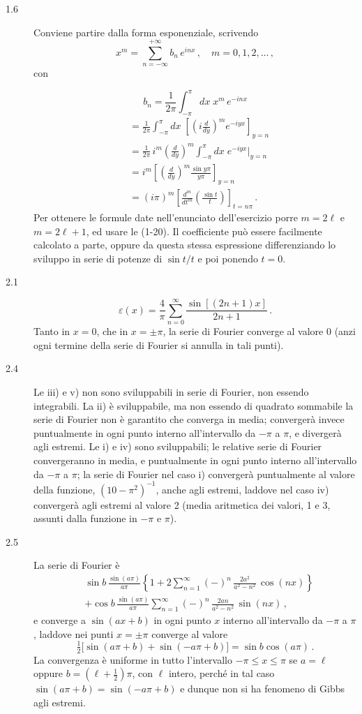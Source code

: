 \documentclass[11pt, a4paper]{book}
\numberwithin{equation}{section}
\begin{document}
\begin{description}
\item[1.6] Conviene partire dalla forma esponenziale, scrivendo
\[
  x^m = \sum_{n=-\infty}^{+\infty} b_n\,e^{inx}\,,\quad m=0,1,2,\ldots\,,
\]
con

\[
  b_n = \frac{1}{2\pi}\int_{-\pi}^{\pi} dx\;x^m\,e^{-inx}
\]
\begin{align*}
  &= \frac{1}{2\pi}\int_{-\pi}^{\pi} dx\;\left[\left(i\frac{d}{dy}\right)^m e^{-iyx}\right]_{y=n}\\
  &= \frac{1}{2\pi}\,i^m\left(\frac{d}{dy}\right)^m\int_{-\pi}^{\pi} dx\;e^{-iyx}\bigg|_{y=n}\\
  &= i^m\left[\left(\frac{d}{dy}\right)^m\frac{\sin y\pi}{y\pi}\right]_{y=n}\\
  &= (i\pi)^m\left[\frac{d^m}{dt^m}\left(\frac{\sin t}{t}\right)\right]_{t=n\pi}\,.
\end{align*}
Per ottenere le formule date nell'enunciato dell'esercizio porre $m=2\ell$ e $m=2\ell+1$, ed usare le (1-20). Il coefficiente può essere facilmente calcolato a parte, oppure da questa stessa espressione differenziando lo sviluppo in serie di potenze di $\sin t/t$ e poi ponendo $t=0$.

\item[2.1]
\[
  \varepsilon(x) = \frac{4}{\pi}\sum_{n=0}^{\infty}\frac{\sin[(2n+1)x]}{2n+1}\,.
\]
Tanto in $x=0$, che in $x=\pm\pi$, la serie di Fourier converge al valore 0 (anzi ogni termine della serie di Fourier si annulla in tali punti).

\item[2.4] Le iii) e v) non sono sviluppabili in serie di Fourier, non essendo integrabili. La ii) è sviluppabile, ma non essendo di quadrato sommabile la serie di Fourier non è garantito che converga in media; convergerà invece puntualmente in ogni punto interno all'intervallo da $-\pi$ a $\pi$, e divergerà agli estremi. Le i) e iv) sono sviluppabili; le relative serie di Fourier convergeranno in media, e puntualmente in ogni punto interno all'intervallo da $-\pi$ a $\pi$; la serie di Fourier nel caso i) convergerà puntualmente al valore della funzione, $(10-\pi^2)^{-1}$, anche agli estremi, laddove nel caso iv) convergerà agli estremi al valore 2 (media aritmetica dei valori, 1 e 3, assunti dalla funzione in $-\pi$ e $\pi$).

\item[2.5] La serie di Fourier è
\begin{align*}
  &\sin b\,\frac{\sin(a\pi)}{a\pi}\left\{1+2\sum_{n=1}^{\infty}(-)^n\,\frac{2a^2}{a^2-n^2}\,\cos(nx)\right\}\\
  &+ \cos b\,\frac{\sin(a\pi)}{a\pi}\sum_{n=1}^{\infty}(-)^n\,\frac{2an}{a^2-n^2}\,\sin(nx)\,,
\end{align*}
e converge a $\sin(ax+b)$ in ogni punto $x$ interno all'intervallo da $-\pi$ a $\pi$, laddove nei punti $x=\pm\pi$ converge al valore
\[
  \tfrac{1}{2}\bigl[\sin(a\pi+b)+\sin(-a\pi+b)\bigr] = \sin b\cos(a\pi)\,.
\]
La convergenza è uniforme in tutto l'intervallo $-\pi \leq x \leq \pi$ se $a=\ell$ oppure $b=(\ell+\frac{1}{2})\pi$, con $\ell$ intero, perché in tal caso $\sin(a\pi+b)=\sin(-a\pi+b)$ e dunque non si ha fenomeno di Gibbs agli estremi.


\end{description}
\end{document}
